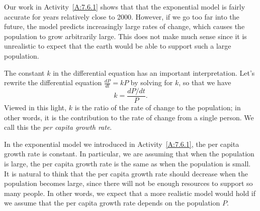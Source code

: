 

Our work in Activity~\ref{A:7.6.1} shows that that the exponential model is fairly accurate for years 
relatively close to 2000.  However, if we go too far into the
future, the model predicts increasingly large rates of change, which
causes the population to grow arbitrarily large.  This does not make
much sense since it is unrealistic to expect that the earth would be able to support
such a large population.  

The constant $k$ in the differential equation has an important
interpretation.  Let's rewrite the differential equation $\frac{dP}{dt} = kP$ by solving for $k$, so that we have
$$k = \frac{dP/dt}{P}.$$
Viewed in this light, $k$ is the ratio of the rate of change to the
population;  in other words, it is the contribution to the rate of change 
from a single person.  We call this the {\em per capita
  growth rate}.

In the exponential model we introduced in Activity~\ref{A:7.6.1}, the per capita growth rate is
constant.  In particular, we are assuming that when the population is
large, the per capita growth rate is the same as when the population
is small.  It is natural to think that the per capita growth rate should
decrease when the population becomes large, since there will not be
enough resources to support so many people.  In other words, we expect that a more realistic model would hold if we assume
that the per capita growth rate depends on the population $P$.


